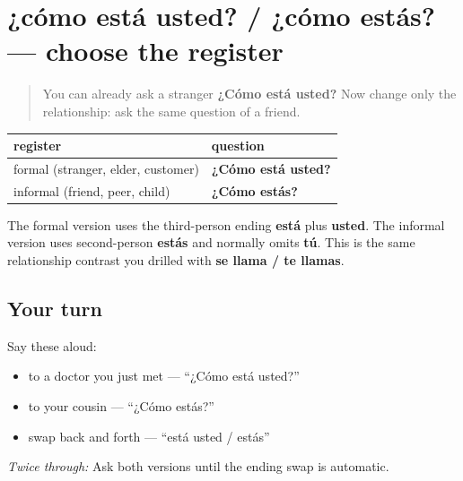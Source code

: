 \section[¿cómo está usted? / ¿cómo estás?]{¿cómo está usted? / ¿cómo estás? — choose the register}

\label{lesson:ES-C04-como-estas-register}



\begin{quote}
You can already ask a stranger \textbf{¿Cómo está usted?} Now change only the relationship: ask the same question of a friend.
\end{quote}

\begin{grammarlens}[title={Grammar Lens: one question, two relationships}]
\noindent
\begin{tabularx}{\linewidth}{@{}>{\raggedright\arraybackslash}X>{\raggedright\arraybackslash}X@{}}
\toprule
\textbf{register} & \textbf{question} \\
\midrule
formal (stranger, elder, customer) & \textbf{¿Cómo está usted?} \\
informal (friend, peer, child) & \textbf{¿Cómo estás?} \\
\bottomrule
\end{tabularx}

The formal version uses the third-person ending \textbf{está} plus \textbf{usted}. The informal version uses second-person \textbf{estás} and normally omits \textbf{tú}. This is the same relationship contrast you drilled with \textbf{se llama / te llamas}.
\end{grammarlens}

\subsection*{Your turn}
Say these aloud:

\begin{itemize}
\raggedright
  \item to a doctor you just met — \textquotedblleft{}¿Cómo está usted?\textquotedblright{}
  \item to your cousin — \textquotedblleft{}¿Cómo estás?\textquotedblright{}
  \item swap back and forth — \textquotedblleft{}está usted / estás\textquotedblright{}
\end{itemize}

\emph{Twice through:} Ask both versions until the ending swap is automatic.

